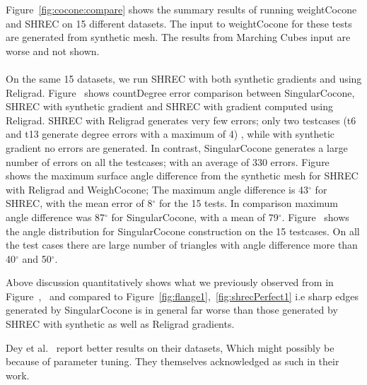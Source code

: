 Figure~\ref{fig:cocone:compare} shows the summary results of running weightCocone and SHREC on 15 different datasets. 
The input to weightCocone  for these tests are generated from synthetic mesh. The results from Marching Cubes input are worse and not shown.
\paragraph{}
On the same 15 datasets, we run SHREC with both synthetic gradients and using Religrad.
Figure~\protect{} shows countDegree error comparison between SingularCocone, SHREC with synthetic gradient and SHREC with gradient computed using Religrad.  SHREC with Religrad generates very few errors; only two testcases (t6 and t13 generate degree errors with a maximum of 4) , while with synthetic gradient no errors are generated. 
In contrast, SingularCocone generates a large number of errors on all the testcases; with an average of 330 errors. Figure~\protect{} shows the maximum surface angle difference from the synthetic mesh for SHREC with Religrad and WeighCocone;
The maximum angle difference is 43$^\circ$ for SHREC, with the mean error of 8$^\circ$ for the 15 tests. In comparison maximum angle difference was 87$^\circ$ for SingularCocone, with a mean of 79$^\circ$.
Figure~\protect{} shows the angle distribution for SingularCocone construction on the 15 testcases. 
On all the test cases there are large number of triangles with angle difference more than 40$^\circ$ and 50$^\circ$.

Above discussion quantitatively shows what we previously observed from  in Figure~\protect{},~\protect{} and compared to Figure~\ref{fig:flange1},~\ref{fig:shrecPerfect1} i.e sharp edges generated by SingularCocone is in general far worse than those generated by SHREC with synthetic as well as Religrad gradients. 

Dey et al.~\cite{Dey2012,Dey2013} report better results on their datasets, Which might possibly be because of parameter tuning. They themselves acknowledged as such in their work.


